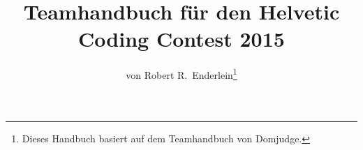 
% 
%
%
\documentclass[11pt,a4paper]{article}
\usepackage{mathptmx}
\usepackage[in]{fullpage}
\usepackage[absolute]{textpos}
\usepackage{graphicx}
\usepackage[ngerman]{babel}
\usepackage[utf8]{inputenc}
\usepackage{fancyhdr}
\usepackage{moreverb}
\usepackage{color}
\usepackage{url}
\usepackage{longtable}
\pagestyle{fancy}


\renewcommand{\baselinestretch}{0.92}


\newcommand{\titleinfolong}{Teamhandbuch für den Helvetic Coding Contest 2015}
\newcommand{\titleinfo}{Teamhandbuch}
\newcommand{\authorinfo}{Robert R.~Enderlein}
\newcommand{\langinfo}{Deutsch}
\newcommand{\taskinfo}{Teamhandbuch}



\title{\titleinfolong}
\author{von \authorinfo\footnote{Dieses Handbuch basiert auf dem Teamhandbuch von
Domjudge.}}
\date{}

\renewcommand{\headrulewidth}{0pt}
\renewcommand{\footrulewidth}{0.4pt}
\lhead{}
\chead{}
\rhead{}
\lfoot{\textcolor{gray}{Helvetic Coding Contest 2015}}
\cfoot{\thepage}
\rfoot{\textcolor{gray}{\titleinfo}}


\maketitle
\thispagestyle{fancy}
\setcounter{page}{1} 

